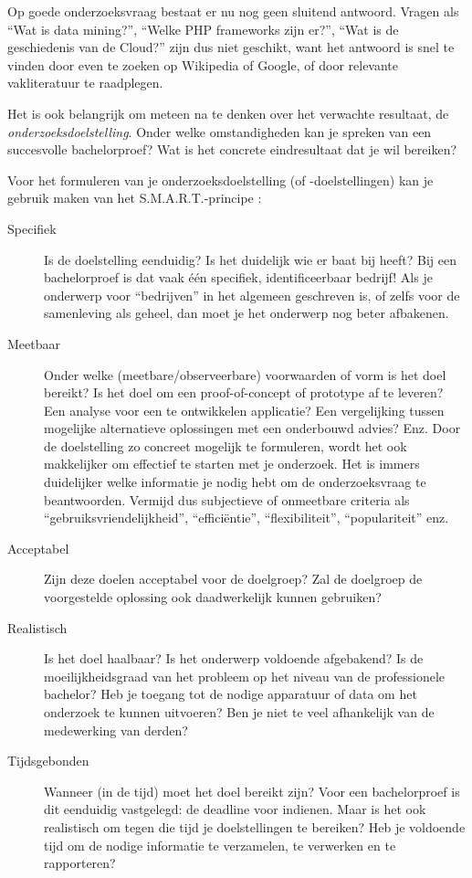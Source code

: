 Op goede onderzoeksvraag bestaat er nu nog geen sluitend antwoord. Vragen als ``Wat is data mining?'', ``Welke PHP frameworks zijn er?'', ``Wat is de geschiedenis van de Cloud?'' zijn dus niet geschikt, want het antwoord is snel te vinden door even te zoeken op Wikipedia of Google, of door relevante vakliteratuur te raadplegen.

Het is ook belangrijk om meteen na te denken over het verwachte resultaat, de \textit{onderzoeksdoelstelling}. Onder welke omstandigheden kan je spreken van een succesvolle bachelorproef? Wat is het concrete eindresultaat dat je wil bereiken?

Voor het formuleren van je onderzoeksdoelstelling (of -doelstellingen) kan je gebruik maken van het S.M.A.R.T.-principe \autocite{Doran1981}:

\begin{description}
  \item[Specifiek] Is de doelstelling eenduidig? Is het duidelijk wie er baat bij heeft? Bij een bachelorproef is dat vaak één specifiek, identificeerbaar bedrijf! Als je onderwerp voor ``bedrijven'' in het algemeen geschreven is, of zelfs voor de samenleving als geheel, dan moet je het onderwerp nog beter afbakenen.
  \item[Meetbaar] Onder welke (meetbare/observeerbare) voorwaarden of vorm is het doel bereikt? Is het doel om een proof-of-concept of prototype af te leveren? Een analyse voor een te ontwikkelen applicatie? Een vergelijking tussen mogelijke alternatieve oplossingen met een onderbouwd advies? Enz. Door de doelstelling zo concreet mogelijk te formuleren, wordt het ook makkelijker om effectief te starten met je onderzoek. Het is immers duidelijker welke informatie je nodig hebt om de onderzoeksvraag te beantwoorden. Vermijd dus subjectieve of onmeetbare criteria als ``gebruiksvriendelijkheid'', ``efficiëntie'', ``flexibiliteit'', ``populariteit'' enz.
  \item[Acceptabel] Zijn deze doelen acceptabel voor de doelgroep? Zal de doelgroep de voorgestelde oplossing ook daadwerkelijk kunnen gebruiken?
  \item[Realistisch] Is het doel haalbaar? Is het onderwerp voldoende afgebakend? Is de moeilijkheidsgraad van het probleem op het niveau van de professionele bachelor? Heb je toegang tot de nodige apparatuur of data om het onderzoek te kunnen uitvoeren? Ben je niet te veel afhankelijk van de medewerking van derden?
  \item[Tijdsgebonden] Wanneer (in de tijd) moet het doel bereikt zijn? Voor een bachelorproef is dit eenduidig vastgelegd: de deadline voor indienen. Maar is het ook realistisch om tegen die tijd je doelstellingen te bereiken? Heb je voldoende tijd om de nodige informatie te verzamelen, te verwerken en te rapporteren?
\end{description}

